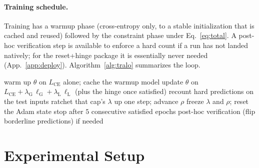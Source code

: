 \documentclass[10pt]{article}
\begin{document}
\paragraph{Training schedule.}
Training has a warmup phase (cross-entropy only, to a stable initialization
that is cached and reused) followed by the constraint phase under
Eq.~\eqref{eq:total}. A post-hoc verification step is available to enforce a
hard count if a run has not landed natively; for the reset+hinge package it
is essentially never needed (App.~\ref{app:deploy}). Algorithm~\ref{alg:tralo}
summarizes the loop.

\begin{algorithm}[t]
\caption{The training loop of the package studied here.}
\label{alg:tralo}
\begin{algorithmic}[1]
\State warm up $\theta$ on $L_{\text{CE}}$ alone; cache the warmup model
  \State update $\theta$ on $L_{\text{CE}} + \lambda_{\mathrm{G}}\,\ell_{\mathrm{G}} + \lambda_{\mathrm{L}}\,\ell_{\mathrm{L}}$ (plus the hinge once satisfied)
  \State recount hard predictions on the test inputs
    \State ratchet that cap's $\lambda$ up one step; advance $\rho$
    \State freeze $\lambda$ and $\rho$; reset the Adam state
  \EndIf
  \State stop after $5$ consecutive satisfied epochs
\EndFor
\State post-hoc verification (flip borderline predictions) if needed
\end{algorithmic}
\end{algorithm}

\section{Experimental Setup}
\label{sec:setup}
\end{document}
